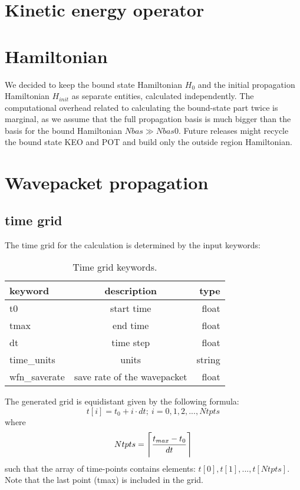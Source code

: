 \documentclass[a4paper,american,floatfix,pdftex,superscriptaddress,twoside,%
aps,pra,
linenumbers,%
reprint,%
]{revtex4-2}%
\DeclarePairedDelimiter{\ceil}{\lceil}{\rceil}
\begin{document}
\section{Kinetic energy operator}

\section{Hamiltonian}
We decided to keep the bound state Hamiltonian $H_0$ and the initial propagation Hamiltonian $H_{init}$ as separate entities, calculated independently. The computational overhead related to calculating the bound-state part twice is marginal, as we assume that the full propagation basis is much bigger than the basis for the bound Hamiltonian $Nbas \gg Nbas0$. Future releases might recycle the bound state KEO and POT and build only the outside region Hamiltonian.

\section{Wavepacket propagation}
\subsection{time grid}
The time grid for the calculation is determined by the input keywords:
\begin{table}[h!]
	\begin{center}
		\caption{Time grid keywords.}
		\label{tab:time-grids}
		\begin{tabular}{l|c|r}
			\textbf{keyword} & \textbf{description} & \textbf{type}\\
			\hline
			t0 & start time & float\\
			tmax & end time & float\\
			dt & time step & float\\
			time\_units & units & string \\
			wfn\_saverate & save rate of the wavepacket  & float \\
			
		\end{tabular}
	\end{center}
\end{table}

The generated grid is equidistant given by the following formula:
\begin{equation}
t[i] = t_0 + i \cdot dt ;\ i=0,1,2,...,Ntpts
\end{equation}
where 
\begin{equation}
Ntpts = \ceil[\Bigg]{\frac{t_{max}-t_0}{dt}}
\end{equation}
such that the array of time-points contains elements: $t[0],t[1],...,t[Ntpts]$.
Note that the last point (tmax) is included in the grid. 



\end{document}
